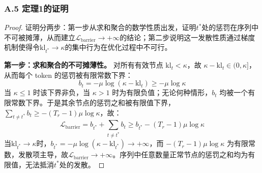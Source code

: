 \documentclass[lettersize,journal]{IEEEtran}
\begin{document}
\subsubsection*{A.5 定理1的证明}\label{app:barrier}
\begin{proof}
证明分两步：第一步从求和聚合的数学性质出发，证明$t^*$处的惩罚在序列中不可被摊薄，从而建立$\mathcal{L}_{\text{barrier}} \to +\infty$的结论；第二步说明这一发散性质通过梯度机制使得令$\mathrm{kl}_{t^*} \to \kappa$的集中行为在优化过程中不可行。

\textbf{第一步：求和聚合的不可摊薄性。}
对所有有效节点 $\mathrm{kl}_t < \kappa$，故 $\kappa - \mathrm{kl}_t \in (0, \kappa]$，从而每个 token 的惩罚被有限常数下界：
\begin{equation}
    b_t = -\mu\log(\kappa - \mathrm{kl}_t) \geq -\mu\log\kappa
\end{equation}
当 $\kappa \leq 1$ 时该下界非负，当 $\kappa > 1$ 时为有限负值；无论何种情形，$b_t$ 均被一个有限常数下界。于是其余节点的惩罚之和被有限值下界，$\sum_{t \neq t^*} b_t \geq -(T_r - 1)\mu\log\kappa$，故：
\begin{equation}
    \mathcal{L}_{\text{barrier}} = b_{t^*} + \sum_{t \neq t^*} b_t 
    \geq b_{t^*} - (T_r - 1)\mu\log\kappa
\end{equation}
当$\mathrm{kl}_{t^*} \to \kappa$时，$b_{t^*} = -\mu\log(\kappa - \mathrm{kl}_{t^*}) \to +\infty$，而 $-(T_r - 1)\mu\log\kappa$ 为有限常数，发散项主导，故$\mathcal{L}_{\text{barrier}} \to +\infty$。序列中任意数量正常节点的惩罚之和均为有限值，无法抵消$t^*$处的发散。


\end{proof}
\end{document}
